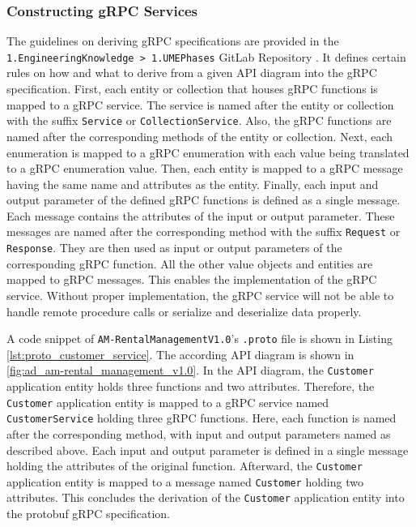 \subsubsection*{Constructing gRPC Services}
The guidelines on deriving gRPC specifications are provided in the \hfill \linebreak \texttt{1.EngineeringKnowledge > 1.UMEPhases} GitLab Repository \cite{CM-G-RPC}.
It defines certain rules on how and what to derive from a given API diagram into the gRPC specification.
First, each entity or collection that houses gRPC functions is mapped to a gRPC service.
The service is named after the entity or collection with the suffix \texttt{Service} or \texttt{CollectionService}.
Also, the gRPC functions are named after the corresponding methods of the entity or collection.
Next, each enumeration is mapped to a gRPC enumeration with each value being translated to a gRPC enumeration value.
Then, each entity is mapped to a gRPC message having the same name and attributes as the entity.
Finally, each input and output parameter of the defined gRPC functions is defined as a single message.
Each message contains the attributes of the input or output parameter.
These messages are named after the corresponding method with the suffix \texttt{Request} or \texttt{Response}.
They are then used as input or output parameters of the corresponding gRPC function. \linebreak
All the other value objects and entities are mapped to gRPC messages.
This enables the implementation of the gRPC service.
Without proper implementation, the gRPC service will not be able to handle remote procedure calls or serialize and deserialize data properly.

A code snippet of \texttt{AM-RentalManagementV1.0}'s \texttt{.proto} file is shown in Listing \autoref{lst:proto_customer_service}.
The according API diagram is shown in \autoref{fig:ad_am-rental_management_v1.0}.
In the API diagram, the \texttt{Customer} application entity holds three functions and two attributes.
Therefore, the \texttt{Customer} application entity is mapped to a gRPC service named \texttt{CustomerService} holding three gRPC functions.
Here, each function is named after the corresponding method, with input and output parameters named as described above.
Each input and output parameter is defined in a single message holding the attributes of the original function.
Afterward, the \texttt{Customer} application entity is mapped to a message named \texttt{Customer} holding two attributes.
This concludes the derivation of the \texttt{Customer} application entity into the protobuf gRPC specification.

